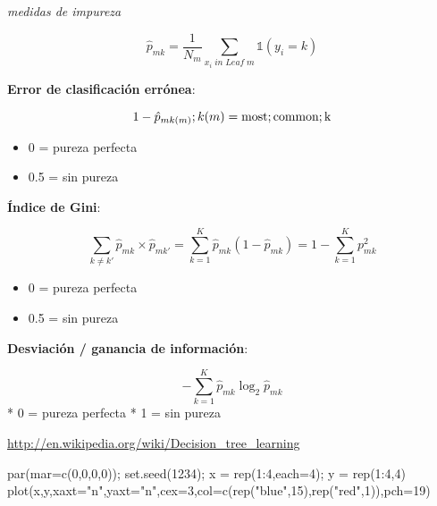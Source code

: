 \documentclass[
]{article}
\newenvironment{Shaded}{\begin{snugshade}}{\end{snugshade}}
\newcommand{\AttributeTok}[1]{\textcolor[rgb]{0.77,0.63,0.00}{#1}}
\newcommand{\DecValTok}[1]{\textcolor[rgb]{0.00,0.00,0.81}{#1}}
\newcommand{\FunctionTok}[1]{\textcolor[rgb]{0.00,0.00,0.00}{#1}}
\newcommand{\NormalTok}[1]{#1}
\newcommand{\OtherTok}[1]{\textcolor[rgb]{0.56,0.35,0.01}{#1}}
\newcommand{\SpecialCharTok}[1]{\textcolor[rgb]{0.00,0.00,0.00}{#1}}
\newcommand{\StringTok}[1]{\textcolor[rgb]{0.31,0.60,0.02}{#1}}
\providecommand{\tightlist}{%
  \setlength{\itemsep}{0pt}\setlength{\parskip}{0pt}}
\begin{document}
\emph{medidas de impureza}

\[\hat{p}_{mk} = \frac{1}{N_m}\sum_{x_i\; in \; Leaf \; m}\mathbb{1}(y_i = k)\]

\textbf{Error de clasificación errónea}:

\[ 1 - \hat{p}_{m k(m)}; k(m) = {\rm most; common; k}\]

\begin{itemize}
\tightlist
\item
  0 = pureza perfecta
\item
  0.5 = sin pureza
\end{itemize}

\textbf{Índice de Gini}:

\[\sum_{k \neq k'} \hat{p}_{mk} \times \hat{p}_{mk'} = \sum_{k=1}^K \hat{p}_{mk}(1-\hat{p}_{mk}) = 1 - \sum_{k=1}^K p_{mk}^2\]

\begin{itemize}
\tightlist
\item
  0 = pureza perfecta
\item
  0.5 = sin pureza
\end{itemize}

\textbf{Desviación / ganancia de información}:

\[-\sum_{k=1}^K \hat{p}_{mk} \log_2\hat{p}_{mk}\] * 0 = pureza perfecta
* 1 = sin pureza

\url{http://en.wikipedia.org/wiki/Decision_tree_learning}

\begin{Shaded}
\begin{Highlighting}[]
\FunctionTok{par}\NormalTok{(}\AttributeTok{mar=}\FunctionTok{c}\NormalTok{(}\DecValTok{0}\NormalTok{,}\DecValTok{0}\NormalTok{,}\DecValTok{0}\NormalTok{,}\DecValTok{0}\NormalTok{)); }\FunctionTok{set.seed}\NormalTok{(}\DecValTok{1234}\NormalTok{); x }\OtherTok{=} \FunctionTok{rep}\NormalTok{(}\DecValTok{1}\SpecialCharTok{:}\DecValTok{4}\NormalTok{,}\AttributeTok{each=}\DecValTok{4}\NormalTok{); y }\OtherTok{=} \FunctionTok{rep}\NormalTok{(}\DecValTok{1}\SpecialCharTok{:}\DecValTok{4}\NormalTok{,}\DecValTok{4}\NormalTok{)}
\FunctionTok{plot}\NormalTok{(x,y,}\AttributeTok{xaxt=}\StringTok{"n"}\NormalTok{,}\AttributeTok{yaxt=}\StringTok{"n"}\NormalTok{,}\AttributeTok{cex=}\DecValTok{3}\NormalTok{,}\AttributeTok{col=}\FunctionTok{c}\NormalTok{(}\FunctionTok{rep}\NormalTok{(}\StringTok{"blue"}\NormalTok{,}\DecValTok{15}\NormalTok{),}\FunctionTok{rep}\NormalTok{(}\StringTok{"red"}\NormalTok{,}\DecValTok{1}\NormalTok{)),}\AttributeTok{pch=}\DecValTok{19}\NormalTok{)}
\end{Highlighting}
\end{Shaded}
\end{document}
